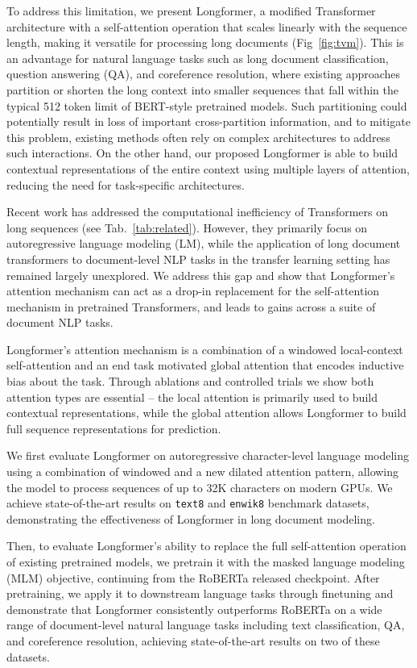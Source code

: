 \documentclass[11pt,a4paper]{article}
\newcommand{\model}{Longformer\xspace}
\begin{document}
To address this limitation, we present \model, a modified Transformer architecture
with a self-attention operation that scales linearly with the sequence length, making it versatile for processing long documents (Fig~\ref{fig:tvm}).
This is an advantage for natural language tasks such as long document classification, question answering (QA), and coreference resolution, where existing approaches partition or shorten the long context into smaller sequences that fall within the typical 512 token limit of BERT-style pretrained models. Such partitioning could potentially result in loss of important cross-partition information, and to mitigate this problem, existing methods often rely on complex architectures to address such interactions. On the other hand, our proposed \model is able to build contextual representations of the entire context using multiple layers of attention, reducing the need for task-specific architectures. 

Recent work has addressed the computational inefficiency of Transformers on long sequences (see Tab.~\ref{tab:related}).
However, they primarily focus on autoregressive language modeling (LM), 
while the application of long document transformers to document-level NLP tasks in the transfer learning setting \cite{NIPS2015_5949,Peters2018DeepCW,Howard2018UniversalLM,bert} has remained largely unexplored.  We address this gap and show that \model's attention mechanism can act as a drop-in replacement for the self-attention mechanism in pretrained Transformers, and leads to gains across a suite of document NLP tasks.

\model's attention mechanism is a combination of a windowed local-context self-attention and an end task motivated global attention that encodes inductive bias about the task.
Through ablations and controlled trials we show both attention types are essential -- the local attention is primarily used to build contextual representations, while the global attention allows \model to build full sequence representations for prediction.

We first evaluate \model on autoregressive character-level language modeling using a combination of windowed and a new dilated attention pattern, allowing the model to process sequences of up to 32K characters on modern GPUs. We achieve state-of-the-art results on \texttt{text8} and \texttt{enwik8} benchmark datasets, demonstrating the effectiveness of \model in long document modeling. 

Then, to evaluate \model's ability to replace the full self-attention operation of existing pretrained models, we pretrain
it with the masked language modeling (MLM) objective, continuing from the RoBERTa \cite{roberta} released checkpoint.
After pretraining, we apply it to downstream language tasks through finetuning and demonstrate that \model consistently outperforms RoBERTa on a wide range of document-level natural language tasks including text classification, QA, and coreference resolution, achieving state-of-the-art results on two of these datasets.
\end{document}
